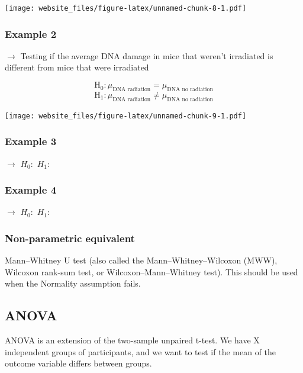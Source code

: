 \documentclass[12pt,]{article}
\begin{document}
\texttt{[image: website\_files/figure-latex/unnamed-chunk-8-1.pdf]}

\newpage

\subsubsection{Example 2}\label{example-2-2}

\(\rightarrow\) Testing if the average DNA damage in mice that weren't
irradiated is different from mice that were irradiated

\[\text{H}_0: \mu_{\text{DNA radiation}} = \mu_{\text{DNA no radiation}}\]
\[\text{H}_1: \mu_{\text{DNA radiation}} \ne \mu_{\text{DNA no radiation}}\]

\texttt{[image: website\_files/figure-latex/unnamed-chunk-9-1.pdf]}

\subsubsection{Example 3}\label{example-3-2}

\(\rightarrow\) \hfill \break
\hfill \break
\hfill \break
\(H_0:\) \hfill \break
\hfill \break
\hfill \break
\(H_1:\)

\newpage

\subsubsection{Example 4}\label{example-4-2}

\(\rightarrow\) \hfill \break
\hfill \break
\hfill \break
\(H_0:\) \hfill \break
\hfill \break
\hfill \break
\(H_1:\)

\subsubsection{Non-parametric
equivalent}\label{non-parametric-equivalent-1}

Mann--Whitney U test (also called the Mann--Whitney--Wilcoxon (MWW),
Wilcoxon rank-sum test, or Wilcoxon--Mann--Whitney test). This should be
used when the Normality assumption fails.

\subsection{ANOVA}\label{anova}

ANOVA is an extension of the two-sample unpaired t-test. We have X
independent groups of participants, and we want to test if the mean of
the outcome variable differs between groups.
\end{document}
